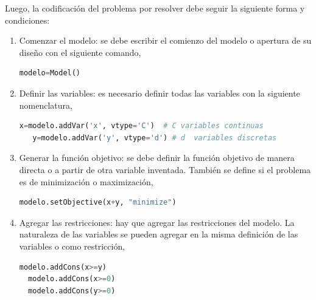 Luego, la codificación del problema por resolver debe seguir la siguiente forma y condiciones:

\begin{enumerate}
    \item Comenzar el modelo: se debe escribir el comienzo del modelo o apertura de su diseño con el siguiente comando,
    
    \begin{footnotesize}
    \begin{lstlisting}[language=Python]
   modelo=Model()
   \end{lstlisting}
    \end{footnotesize}
   
   \item Definir las variables: es necesario definir todas las variables con la siguiente nomenclatura,
   
   \begin{footnotesize}
   \begin{lstlisting}[language=Python]
   x=modelo.addVar('x', vtype='C')  # C variables continuas 
   y=modelo.addVar('y', vtype='d') # d  variables discretas 
   \end{lstlisting}
   \end{footnotesize}
   
   \item Generar la función objetivo: se debe definir la función objetivo de manera directa o a partir de otra variable inventada. También se define si el problema es de minimización o maximización,
   
   \begin{footnotesize}
   \begin{lstlisting}[language=Python]
  modelo.setObjective(x+y, "minimize")
  \end{lstlisting}
   \end{footnotesize}
   
  \item Agregar las restricciones: hay que agregar las restricciones del modelo. La naturaleza de las variables se pueden agregar en la misma definición de las variables o como restricción,
  
  \begin{footnotesize}
  \begin{lstlisting}[language=Python]
  modelo.addCons(x>=y)
  modelo.addCons(x>=0)
  modelo.addCons(y>=0)
  \end{lstlisting}
  \end{footnotesize}
  

\end{enumerate}
